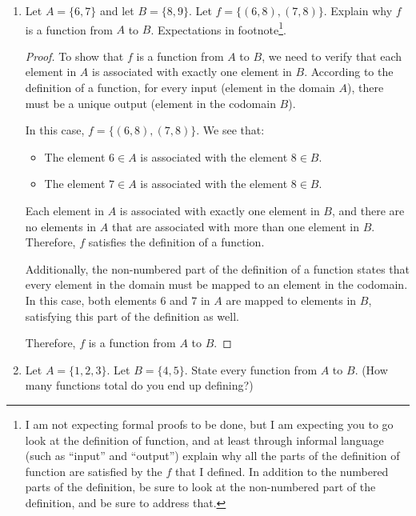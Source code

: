 \documentclass{article}
\begin{document}
\begin{enumerate}
          \newpage

    \item Let $A = \{6,7\}$ and let $B=\{8,9\}$. Let $f=\{(6,8),(7,8)\}$. Explain why $f$
          is a function from $A$ to $B$. Expectations in footnote\footnote{I am not
              expecting formal proofs to be done, but I am expecting you to go look at the
              definition of function, and at least through informal language (such as
              ``input'' and ``output'') explain why all the parts of the definition of
              function are satisfied by the $f$ that I defined. In addition to the numbered
              parts of the definition, be sure to look at the non-numbered part of the
              definition, and be sure to address that.}.

          \begin{proof}
              To show that $f$ is a function from $A$ to $B$, we need to verify that each element in $A$ is associated with exactly one element in $B$. According to the definition of a function, for every input (element in the domain $A$), there must be a unique output (element in the codomain $B$).

              In this case, $f = \{(6,8),(7,8)\}$. We see that:
              \begin{itemize}
                  \item The element $6 \in A$ is associated with the element $8 \in B$.
                  \item The element $7 \in A$ is associated with the element $8 \in B$.
              \end{itemize}
              Each element in $A$ is associated with exactly one element in $B$, and there are no elements in $A$ that are associated with more than one element in $B$. Therefore, $f$ satisfies the definition of a function.

              Additionally, the non-numbered part of the definition of a function states that
              every element in the domain must be mapped to an element in the codomain. In
              this case, both elements $6$ and $7$ in $A$ are mapped to elements in $B$,
              satisfying this part of the definition as well.

              Therefore, $f$ is a function from $A$ to $B$.
          \end{proof}

          \newpage

    \item Let $A = \{1,2,3\}$. Let $B = \{4,5\}$. State every function from $A$ to $B$.
          (How many functions total do you end up defining?)


\end{enumerate}
\end{document}
